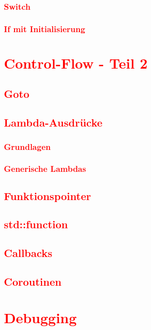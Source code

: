 \subsection{\textcolor{red}{Switch}}\label{sec:switch}
\subsection{\textcolor{red}{If mit Initialisierung}}\label{sec:if-with-initialization}

\chapter{\textcolor{red}{Control-Flow - Teil 2}}\label{chap:control-flow-2}
\section{\textcolor{red}{Goto}}\label{sec:goto}
\section{\textcolor{red}{Lambda-Ausdrücke}}\label{sec:lambda-expressions}
\subsection{\textcolor{red}{Grundlagen}}\label{sec:lambda-basics}
\subsection{\textcolor{red}{Generische Lambdas}}\label{sec:generic-lambdas}
\section{\textcolor{red}{Funktionspointer}}\label{sec:function-pointers}
\section{\textcolor{red}{std::function}}\label{sec:std-function}
\section{\textcolor{red}{Callbacks}}\label{sec:callbacks}
\section{\textcolor{red}{Coroutinen}}\label{sec:coroutines}

\chapter{\textcolor{red}{Debugging}}\label{chap:debugging}
